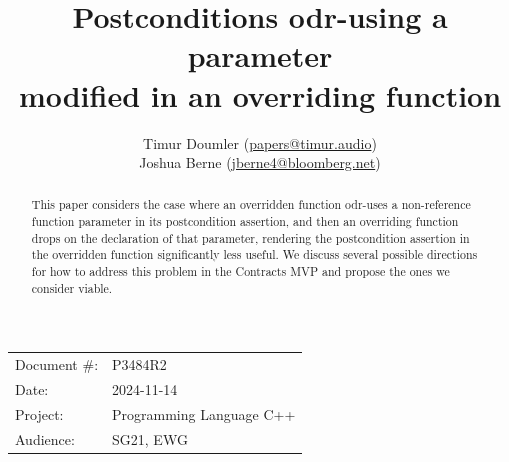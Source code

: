 

 \usepackage[bottom]{footmisc} 

 \usepackage{longtable}


\usepackage{tikz,lipsum,lmodern}
\usepackage[most]{tcolorbox}



\usepackage{titlesec}
\usepackage{tocloft}


\newcommand{\changelocaltocdepth}[1]{%
  \addtocontents{toc}{\protect\setcounter{tocdepth}{#1}}%
  \setcounter{tocdepth}{#1}%
}

\setcounter{tocdepth}{3}



\title{Postconditions odr-using a parameter \\ modified in an overriding function}
\author{
Timur Doumler \small(\href{mailto:papers@timur.audio}{papers@timur.audio}) \\
Joshua Berne \small(\href{mailto:jberne4@bloomberg.net}{jberne4@bloomberg.net}) \\
}
\date{}
\maketitle

\begin{tabular}{ll}
Document \#: & P3484R2 \\
Date: &2024-11-14 \\
Project: & Programming Language C++ \\
Audience: & SG21, EWG
\end{tabular}

\begin{abstract}
This paper considers the case where an overridden function odr-uses a non-reference function parameter in its postcondition assertion, and then an overriding function drops  on the declaration of that parameter, rendering the postcondition assertion in the overridden function significantly less useful. We discuss several possible directions for how to address this problem in the Contracts MVP \cite{P2900R10} and propose the ones we consider viable.
\end{abstract}

